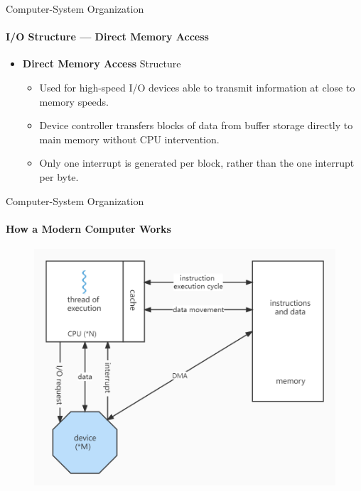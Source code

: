 \documentclass[10pt]{beamer}
\begin{document}
\begin{frame}{Computer-System Organization}
\framesubtitle{I/O Structure --- Direct Memory Access}
\begin{itemize}
\item \textbf{\alert{Direct Memory Access}} Structure
\begin{itemize}
\item Used for high-speed I/O devices able to transmit information at close to memory speeds.
\item Device controller transfers blocks of data from buffer storage directly to main memory without CPU intervention.
\item Only one interrupt is generated per block, rather than the one interrupt per byte.
\end{itemize}
\end{itemize}
\end{frame}

\begin{frame}{Computer-System Organization}
\framesubtitle{How a Modern Computer Works}
\begin{figure}
\includegraphics[width=.8\linewidth]{resources/1-23how_a_modern_computer_works.jpg} 
\end{figure}
\end{frame}
\end{document}
